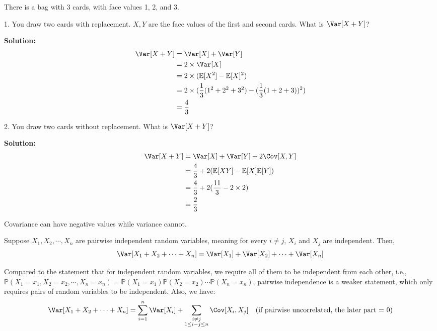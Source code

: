 \begin{eg}
    There is a bag with 3 cards, with face values 1, 2, and 3.
    
    1. You draw two cards with replacement. \(X, Y\) are the face values of the first and second cards. What is \(\Var[X + Y]\)?

    \textbf{Solution:} 
    \[
    \begin{aligned}
        \Var[X + Y] &= \Var[X] + \Var[Y] \\
        &= 2 \times \Var[X] \\
        &= 2 \times (\mathbb{E}[X^2] - \mathbb{E}[X]^2) \\
        &= 2 \times (\frac{1}{3}(1^2 + 2^2 + 3^2) - (\frac{1}{3}(1 + 2 + 3))^2) \\
        &= \dfrac{4}{3}
    \end{aligned}
    \]

    2. You draw two cards without replacement. What is \(\Var[X + Y]\)?

    \textbf{Solution:} 
    \[
        \begin{aligned}
            \Var[X + Y] &= \Var[X] + \Var[Y] + 2\Cov[X, Y] \\
            &= \frac{4}{3} + 2(\mathbb{E}[XY] - \mathbb{E}[X]\mathbb{E}[Y]) \\
            &= \frac{4}{3} + 2(\frac{11}{3} - 2 \times 2) \\
            &= \dfrac{2}{3}
        \end{aligned}
    \]

    \begin{remark}
        Covariance can have negative values while variance cannot.
    \end{remark}
\end{eg}

Suppose \(X_1, X_2, \cdots, X_n\) are pairwise independent random variables, meaning for every \(i \neq j\), \(X_i\) and \(X_j\) are independent. Then,
\[
    \Var[X_1 + X_2 + \cdots + X_n] = \Var[X_1] + \Var[X_2] + \cdots + \Var[X_n]
\]

Compared to the statement that for independent random variables, we require all of them to be independent from each other, i.e., \(\mathbb{P}(X_1 = x_1, X_2 = x_2, \cdots, X_n = x_n) = \mathbb{P}(X_1 = x_1)\mathbb{P}(X_2 = x_2) \cdots \mathbb{P}(X_n = x_n)\), pairwise independence is a weaker statement, which only requires pairs of random variables to be independent. Also, we have: 
\[
    \Var[X_1 + X_2 + \cdots + X_n] = \sum_{i = 1}^n \Var[X_i] + \sum_{\substack{i \neq j \\ 1 \leq  i - j \leq n}}\Cov[X_i, X_j] \quad (\text{if pairwise uncorrelated, the later part = 0})
\]


